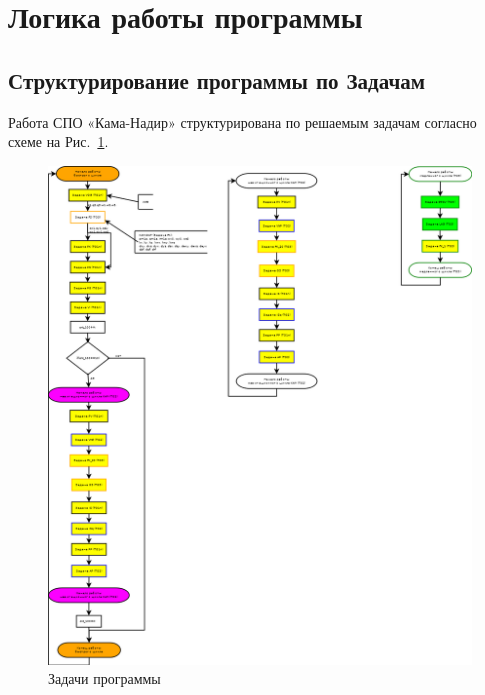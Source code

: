 \section{Логика работы программы} \label{logic}
\subsection{Структурирование программы по Задачам}
Работа СПО «Кама-Надир» структурирована по решаемым задачам согласно  схеме на Рис.~\ref{fig:general_scheme}.
\begin{figure}[H]
    \centering
    \includegraphics[width=1.0\linewidth]{images/general_scheme.png}
    \caption{Задачи программы}
    \label{fig:general_scheme}
\end{figure}
